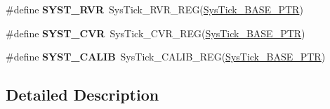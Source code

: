 \begin{DoxyCompactItemize}
\#define {\bfseries S\+Y\+S\+T\+\_\+\+R\+VR}~Sys\+Tick\+\_\+\+R\+V\+R\+\_\+\+R\+EG(\hyperlink{group___sys_tick___peripheral_gaeef73642fdef722ce658e468dad877ea}{Sys\+Tick\+\_\+\+B\+A\+S\+E\+\_\+\+P\+TR})
\item 
\mbox{\label{group___sys_tick___register___accessor___macros_gae3dc4d2dbfdf38c593a5581415fecfed}} 
\#define {\bfseries S\+Y\+S\+T\+\_\+\+C\+VR}~Sys\+Tick\+\_\+\+C\+V\+R\+\_\+\+R\+EG(\hyperlink{group___sys_tick___peripheral_gaeef73642fdef722ce658e468dad877ea}{Sys\+Tick\+\_\+\+B\+A\+S\+E\+\_\+\+P\+TR})
\item 
\mbox{\label{group___sys_tick___register___accessor___macros_ga2d37582dd39f59744e340cce09230250}} 
\#define {\bfseries S\+Y\+S\+T\+\_\+\+C\+A\+L\+IB}~Sys\+Tick\+\_\+\+C\+A\+L\+I\+B\+\_\+\+R\+EG(\hyperlink{group___sys_tick___peripheral_gaeef73642fdef722ce658e468dad877ea}{Sys\+Tick\+\_\+\+B\+A\+S\+E\+\_\+\+P\+TR})
\end{DoxyCompactItemize}


\subsection{Detailed Description}

